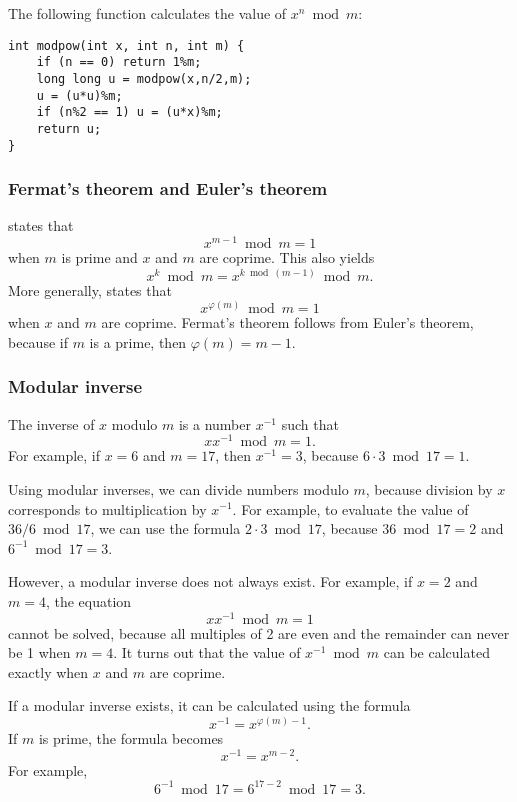 The following function calculates the value of
$x^n \bmod m$:

\begin{lstlisting}
int modpow(int x, int n, int m) {
    if (n == 0) return 1%m;
    long long u = modpow(x,n/2,m);
    u = (u*u)%m;
    if (n%2 == 1) u = (u*x)%m;
    return u;
}
\end{lstlisting}

\subsubsection{Fermat's theorem and Euler's theorem}


states that
\[x^{m-1} \bmod m = 1\]
when $m$ is prime and $x$ and $m$ are coprime.
This also yields
\[x^k \bmod m = x^{k \bmod (m-1)} \bmod m.\]
More generally, 
states that
\[x^{\varphi(m)} \bmod m = 1\]
when $x$ and $m$ are coprime.
Fermat's theorem follows from Euler's theorem,
because if $m$ is a prime, then $\varphi(m)=m-1$.

\subsubsection{Modular inverse}


The inverse of $x$ modulo $m$
is a number $x^{-1}$ such that
\[ x x^{-1} \bmod m = 1. \]
For example, if $x=6$ and $m=17$,
then $x^{-1}=3$, because $6\cdot3 \bmod 17=1$.

Using modular inverses, we can divide numbers
modulo $m$, because division by $x$
corresponds to multiplication by $x^{-1}$.
For example, to evaluate the value of $36/6 \bmod 17$,
we can use the formula $2 \cdot 3 \bmod 17$,
because $36 \bmod 17 = 2$ and $6^{-1} \bmod 17 = 3$.

However, a modular inverse does not always exist.
For example, if $x=2$ and $m=4$, the equation
\[ x x^{-1} \bmod m = 1 \]
cannot be solved, because all multiples of 2
are even and the remainder can never be 1 when $m=4$.
It turns out that the value of $x^{-1} \bmod m$
can be calculated exactly when $x$ and $m$ are coprime.

If a modular inverse exists, it can be
calculated using the formula
\[
x^{-1} = x^{\varphi(m)-1}.
\]
If $m$ is prime, the formula becomes
\[
x^{-1} = x^{m-2}.
\]
For example,
\[6^{-1} \bmod 17 =6^{17-2} \bmod 17 = 3.\]


